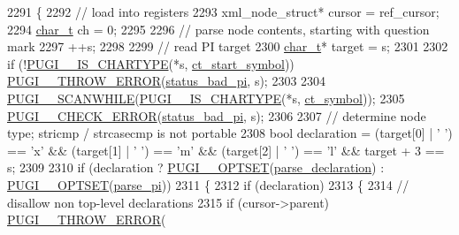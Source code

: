 \begin{DoxyCode}
2291         \{
2292             \textcolor{comment}{// load into registers}
2293             xml\_node\_struct* cursor = ref\_cursor;
2294             \hyperlink{namespacepugi_aef5a7a62cba0507542220ea15afe39df}{char\_t} ch = 0;
2295 
2296             \textcolor{comment}{// parse node contents, starting with question mark}
2297             ++s;
2298 
2299             \textcolor{comment}{// read PI target}
2300             \hyperlink{namespacepugi_aef5a7a62cba0507542220ea15afe39df}{char\_t}* target = s;
2301 
2302             \textcolor{keywordflow}{if} (!\hyperlink{pugixml_8cpp_a2adf5ae9b7505408a18e9f3bb1b3d332}{PUGI\_\_IS\_CHARTYPE}(*s, \hyperlink{pugixml_8cpp_ae83a55e5947d28c62625b690b1484108a25a043d6a8b5a269b3cd8f512d712798}{ct\_start\_symbol})) 
      \hyperlink{pugixml_8cpp_a8af02d87a10272f03f96ab93a96d7202}{PUGI\_\_THROW\_ERROR}(\hyperlink{namespacepugi_a9054ca609e12afb8f3e5892fc6c0b555ad7a57e8554aabea52ed8b0d6a0891622}{status\_bad\_pi}, s);
2303 
2304             \hyperlink{pugixml_8cpp_adfcdc54e9f7e0f2d3927b4a7690abf2a}{PUGI\_\_SCANWHILE}(\hyperlink{pugixml_8cpp_a2adf5ae9b7505408a18e9f3bb1b3d332}{PUGI\_\_IS\_CHARTYPE}(*s, 
      \hyperlink{pugixml_8cpp_ae83a55e5947d28c62625b690b1484108af8e561bd4654ab93d82193fdd3727915}{ct\_symbol}));
2305             \hyperlink{pugixml_8cpp_a03531d9b3c74f0843567257537edfd53}{PUGI\_\_CHECK\_ERROR}(\hyperlink{namespacepugi_a9054ca609e12afb8f3e5892fc6c0b555ad7a57e8554aabea52ed8b0d6a0891622}{status\_bad\_pi}, s);
2306 
2307             \textcolor{comment}{// determine node type; stricmp / strcasecmp is not portable}
2308             \textcolor{keywordtype}{bool} declaration = (target[0] | \textcolor{charliteral}{' '}) == \textcolor{charliteral}{'x'} && (target[1] | \textcolor{charliteral}{' '}) == \textcolor{charliteral}{'m'} && (target[2] | \textcolor{charliteral}{' '}) ==
       \textcolor{charliteral}{'l'} && target + 3 == s;
2309 
2310             \textcolor{keywordflow}{if} (declaration ? \hyperlink{pugixml_8cpp_a06966692c7864407ceffff065b4d7da2}{PUGI\_\_OPTSET}(\hyperlink{namespacepugi_adb5db03ce720dcd90e900b9bb7e70427}{parse\_declaration}) : 
      \hyperlink{pugixml_8cpp_a06966692c7864407ceffff065b4d7da2}{PUGI\_\_OPTSET}(\hyperlink{namespacepugi_a8fb7ea408d60b4f2ca79dd30b651f545}{parse\_pi}))
2311             \{
2312                 \textcolor{keywordflow}{if} (declaration)
2313                 \{
2314                     \textcolor{comment}{// disallow non top-level declarations}
2315                     \textcolor{keywordflow}{if} (cursor->parent) \hyperlink{pugixml_8cpp_a8af02d87a10272f03f96ab93a96d7202}{PUGI\_\_THROW\_ERROR}(

\end{DoxyCode}
